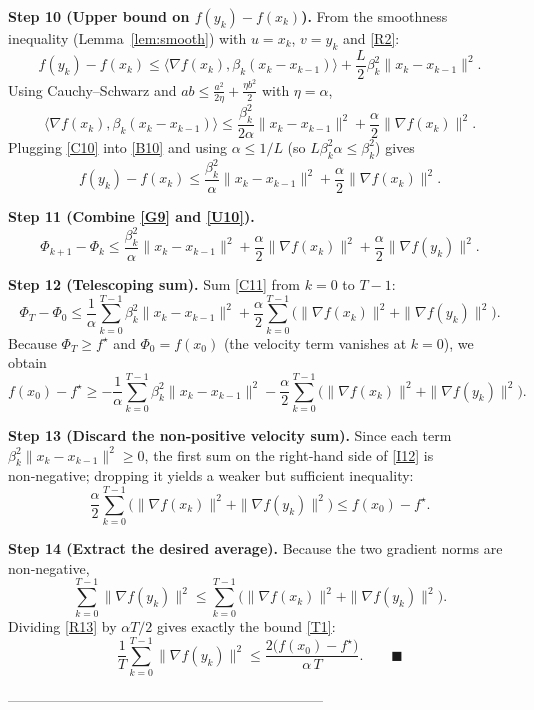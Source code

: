 \documentclass{article}
\begin{document}
\medskip
\noindent\textbf{Step 10 (Upper bound on $f(y_k)-f(x_k)$).}  
From the smoothness inequality (Lemma~\ref{lem:smooth}) with $u=x_k$, $v=y_k$ and \eqref{R2}:
\[
f(y_k)-f(x_k)\le\langle\nabla f(x_k),\beta_k (x_k-x_{k-1})\rangle
               +\frac{L}{2}\beta_k^2\|x_k-x_{k-1}\|^2 . \tag{B10}
\]
Using Cauchy–Schwarz and $ab\le\frac{a^2}{2\eta}+\frac{\eta b^2}{2}$ with $\eta=\alpha$,
\[
\langle\nabla f(x_k),\beta_k (x_k-x_{k-1})\rangle
\le \frac{\beta_k^2}{2\alpha}\|x_k-x_{k-1}\|^2+\frac{\alpha}{2}\|\nabla f(x_k)\|^2 . \tag{C10}
\]
Plugging \eqref{C10} into \eqref{B10} and using $\alpha\le 1/L$ (so $L\beta_k^2\alpha\le\beta_k^2$) gives
\[
f(y_k)-f(x_k)
\le \frac{\beta_k^2}{\alpha}\|x_k-x_{k-1}\|^2
   +\frac{\alpha}{2}\|\nabla f(x_k)\|^2 . \tag{U10}
\]

\medskip
\noindent\textbf{Step 11 (Combine \eqref{G9} and \eqref{U10}).}  
\[
\Phi_{k+1}-\Phi_k
\le \frac{\beta_k^2}{\alpha}\|x_k-x_{k-1}\|^2
   +\frac{\alpha}{2}\|\nabla f(x_k)\|^2
   +\frac{\alpha}{2}\|\nabla f(y_k)\|^2 . \tag{C11}
\]

\medskip
\noindent\textbf{Step 12 (Telescoping sum).}  
Sum \eqref{C11} from $k=0$ to $T-1$:
\[
\Phi_T-\Phi_0
\le \frac{1}{\alpha}\sum_{k=0}^{T-1}\beta_k^2\|x_k-x_{k-1}\|^2
   +\frac{\alpha}{2}\sum_{k=0}^{T-1}\bigl(\|\nabla f(x_k)\|^2+\|\nabla f(y_k)\|^2\bigr). \tag{S12}
\]
Because $\Phi_T\ge f^\star$ and $\Phi_0 = f(x_0)$ (the velocity term vanishes at $k=0$), we obtain
\[
f(x_0)-f^\star
\ge -\frac{1}{\alpha}\sum_{k=0}^{T-1}\beta_k^2\|x_k-x_{k-1}\|^2
   -\frac{\alpha}{2}\sum_{k=0}^{T-1}\bigl(\|\nabla f(x_k)\|^2+\|\nabla f(y_k)\|^2\bigr). \tag{I12}
\]

\medskip
\noindent\textbf{Step 13 (Discard the non‑positive velocity sum).}  
Since each term $\beta_k^2\|x_k-x_{k-1}\|^2\ge0$, the first sum on the right‑hand side of \eqref{I12} is non‑negative; dropping it yields a weaker but sufficient inequality:
\[
\frac{\alpha}{2}\sum_{k=0}^{T-1}\bigl(\|\nabla f(x_k)\|^2+\|\nabla f(y_k)\|^2\bigr)
\le f(x_0)-f^\star . \tag{R13}
\]

\medskip
\noindent\textbf{Step 14 (Extract the desired average).}  
Because the two gradient norms are non‑negative,
\[
\sum_{k=0}^{T-1}\|\nabla f(y_k)\|^2 \le
\sum_{k=0}^{T-1}\bigl(\|\nabla f(x_k)\|^2+\|\nabla f(y_k)\|^2\bigr) .
\]
Dividing \eqref{R13} by $\alpha T/2$ gives exactly the bound \eqref{T1}:
\[
\frac{1}{T}\sum_{k=0}^{T-1}\|\nabla f(y_k)\|^2
\le \frac{2\bigl(f(x_0)-f^\star\bigr)}{\alpha\,T}. \qquad\blacksquare
\]

--------------------------------------------------------------------
\end{document}
